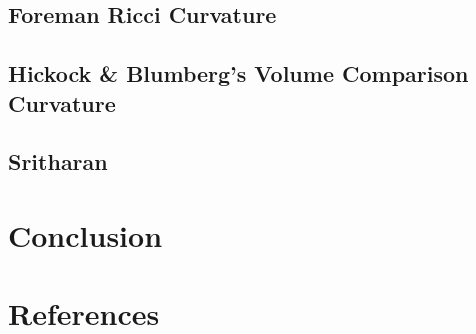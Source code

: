 \documentclass[
  letterpaper,
  DIV=11,
  numbers=noendperiod]{scrartcl}
\theoremstyle{plain}
\theoremstyle{definition}
\theoremstyle{definition}
\theoremstyle{plain}
\theoremstyle{plain}
\theoremstyle{remark}
\begin{document}
\subsection{Foreman Ricci Curvature}\label{foreman-ricci-curvature}

\subsection{Hickock \& Blumberg's Volume Comparison
Curvature}\label{hickock-blumbergs-volume-comparison-curvature}

\subsection{Sritharan}\label{sritharan}

\section{Conclusion}\label{conclusion}

\section*{References}\label{references}
\end{document}
